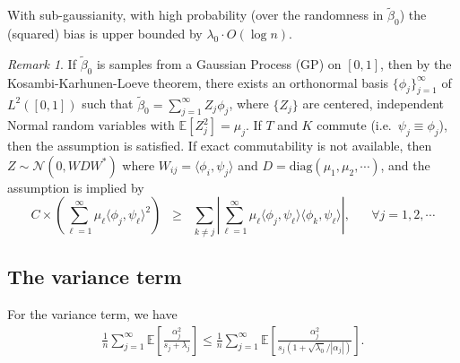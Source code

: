 \documentclass[11pt,a4paper]{article}
\renewcommand{\tilde}{\widetilde}
\theoremstyle{definition}
\theoremstyle{plain}
\theoremstyle{remark}
\newtheorem{remark}{Remark}[section]
\newcommand{\ud}{\mathrm d}
\newcommand{\diag}{\mathrm{diag}}
\begin{document}
With sub-gaussianity, with high probability (over the randomness in $\tilde\beta_0$) the (squared) bias is upper bounded by $\lambda_0\cdot O(\log n)$.

\begin{remark}
If $\tilde\beta_0$ is samples from a Gaussian Process (GP) on $[0,1]$, then by the Kosambi-Karhunen-Loeve theorem, there exists an orthonormal basis $\{\phi_j\}_{j=1}^{\infty}$ of $L^2([0,1])$
such that $\tilde\beta_0 = \sum_{j=1}^{\infty}Z_j\phi_j$, where $\{Z_j\}$ are centered, independent Normal random variables with $\mathbb E[Z_j^2]=\mu_j$.
If $T$ and $K$ commute (i.e.~$\psi_j\equiv \phi_j$), then the assumption is satisfied. If exact commutability is not available, then $Z\sim \mathcal N(0, WDW^*)$
where $W_{ij}=\langle\phi_i,\psi_j\rangle$ and $D=\diag(\mu_1,\mu_2,\cdots)$, and the assumption is implied by
$$
C\times \left(\sum_{\ell=1}^{\infty}\mu_\ell\langle\phi_j,\psi_\ell\rangle^2\right) \;\;\geq\;\;  \sum_{k\neq j}\left|\sum_{\ell=1}^{\infty}\mu_\ell\langle\phi_j,\psi_\ell\rangle\langle\phi_k,\psi_\ell\rangle\right|, \;\;\;\;\;\;\forall j=1,2,\cdots
$$
\end{remark}

\subsection{The variance term}

For the variance term, we have
\begin{align*}
\frac{1}{n}\sum_{j=1}^{\infty}\mathbb E\left[\frac{\alpha_j^2}{s_j+\lambda_j}\right]\leq \frac{1}{n}\sum_{j=1}^{\infty} \mathbb E\left[\frac{\alpha_j^2}{s_j(1+\sqrt{\lambda_0}/|\alpha_j|)}\right].
\end{align*}

\end{document}
